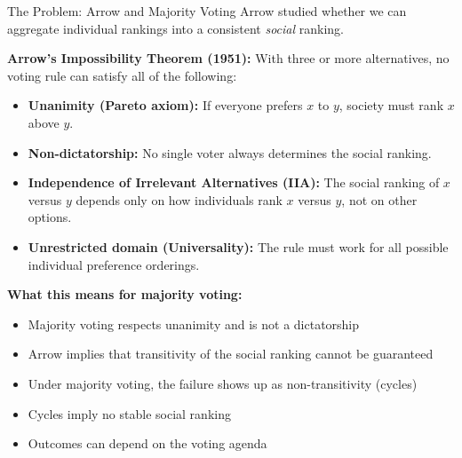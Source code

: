 \documentclass[10pt]{beamer}
\begin{document}
\begin{frame}[allowframebreaks]{The Problem: Arrow and Majority Voting}
\small Arrow studied whether we can aggregate individual rankings into a consistent \emph{social} ranking.

\textbf{Arrow’s Impossibility Theorem (1951):}
 With three or more alternatives, no voting rule can satisfy all of the following:
\begin{itemize}
\item \textbf{Unanimity (Pareto axiom):}  
If everyone prefers $x$ to $y$, society must rank $x$ above $y$.

\item \textbf{Non-dictatorship:}  
No single voter always determines the social ranking.

\item \textbf{Independence of Irrelevant Alternatives (IIA):}  
The social ranking of $x$ versus $y$ depends only on how individuals rank $x$ versus $y$, not on other options.

\item \textbf{Unrestricted domain (Universality):}  
The rule must work for all possible individual preference orderings.
\end{itemize}

\framebreak


\textbf{What this means for majority voting:}
\begin{itemize}
\item Majority voting respects unanimity and is not a dictatorship
\item Arrow implies that transitivity of the social ranking cannot be guaranteed
\item Under majority voting, the failure shows up as \alert{non-transitivity} (cycles)
\item Cycles imply no stable social ranking
\item Outcomes can depend on the voting agenda
\end{itemize}
\end{frame}
\end{document}
